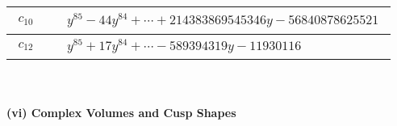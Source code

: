 \documentclass[1p]{elsarticle_modified}
\theoremstyle{definition}
\begin{document}
\begin{tabular}{m{50pt}|m{274pt}}
\hline $$\begin{aligned}c_{10}\end{aligned}$$&$\begin{aligned}
&y^{85}-44 y^{84}+\cdots+214383869545346 y-56840878625521
\end{aligned}$\\
\hline $$\begin{aligned}c_{12}\end{aligned}$$&$\begin{aligned}
&y^{85}+17 y^{84}+\cdots-589394319 y-11930116
\end{aligned}$\\
\hline
\end{tabular}\\~\\
\newpage\flushleft \textbf{(vi) Complex Volumes and Cusp Shapes}
\end{document}
